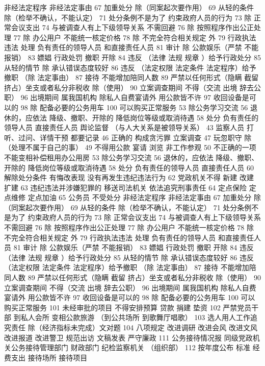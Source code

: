\documentclass[11pt]{ctexart}
\begin{document}
非经法定程序
非经法定事由
67 加重处分
除（同案起次要作用）
69 从轻的条件
除（检举不确认，不能认定）
71 处分条例不是为了
约束政府人员的行为
73 除 正常会议支出
74 与被调查人有上下级领导关系 不需回避
76 除 按照程序作出公正处理
77 除 办公用户
不能统一核定价格
78 除 不完全符合相关规定 外
79 行政执法违法 处理
负有责任的领导人员
和直接责任人员
81 审计
除 公款娱乐（严禁 不能报销）
83 嫖娼 行政处罚
撤职 开除
84 违反 （法律 法规 规章 ）给予行政处分
85 从轻的情节
除 承认错误态度较好
86 违反 （法定权限 法定条件 法定程序）给予撤职
（除 法定事由）
87 接待 不能增加陪同人数
89 严禁以任何形式（隐瞒 截留 挤占）坐支或者私分非税收
除（使用）
90 立案调查期间 不得（交流 出境 辞去公职）
96 出境期间 属我国机构 除私人自费宴请外 用公款皆不许
97 收回设备是可以的
98 除 配备必要的公务用车
100 可以购买正常服务
53 除公务学习交流
56 退休的，应依法
降级、撤职、开除的 降低岗位等级或取消待遇
58 处分
负有责任的领导人员
直接责任人员 舆论监督
（与人大关系是被领导关系）
43 监察人员
打听、过问、详情干预 都要记录
46 正确的
构成贪污罪
立案调查
47 玩忽职守
除（处理不属于自己的事）
49 不得用公款
宴请 浏览 非工作参观
50 不正确的一项
不能变相补偿租用办公用房
53 除公务学习交流
56 退休的，应依法
降级、撤职、开除的 降低岗位等级或取消待遇
58 处分
负有责任的领导人员
直接责任人员
60 解除处分条件
有悔改表现
没有再发生违纪违法行为
62 党政机关不得
新建 改建 扩建
63 违纪违法并涉嫌犯罪的
移送司法机关
依法追究刑事责任
64 定点保险 定点维修 定点加油
65 公务员 不受处分
非经法定程序
非经法定事由
67 加重处分
除（同案起次要作用）
69 从轻的条件
除（检举不确认，不能认定）
71 处分条例不是为了
约束政府人员的行为
73 除 正常会议支出
74 与被调查人有上下级领导关系 不需回避
76 除 按照程序作出公正处理
77 除 办公用户
不能统一核定价格
78 除 不完全符合相关规定 外
79 行政执法违法 处理
负有责任的领导人员
和直接责任人员
81 审计
除 公款娱乐（严禁 不能报销）
83 嫖娼 行政处罚
撤职 开除
84 违反 （法律 法规 规章 ）给予行政处分
85 从轻的情节
除 承认错误态度较好
86 违反 （法定权限 法定条件 法定程序）给予撤职
（除 法定事由）
87 接待 不能增加陪同人数
89 严禁以任何形式（隐瞒 截留 挤占）坐支或者私分非税收
除（使用）
90 立案调查期间 不得（交流 出境 辞去公职）
96 出境期间 属我国机构 除私人自费宴请外 用公款皆不许
97 收回设备是可以的
98 除 配备必要的公务用车
100 可以购买正常服务
101 未经审批的项目
不得安排预算 贷款 捐建 垫资
102 严禁党员干部
到私人会所 变相公款旅游
（到公共场所 到歌舞厅唱歌）
103 选人用人工作追究责任
除（经济指标未完成）文对题
104 八项规定
改进调研 改进会风
改进文风 改进报道
改进警卫 规范出访
文稿发表 严守廉政
111 公务接待情况报
同级党政机关公务接待管理部门
财政部门
纪检监察机关
（组织部）
112 按年度公布
标准 经费支出 接待场所 接待项目
\end{document}
